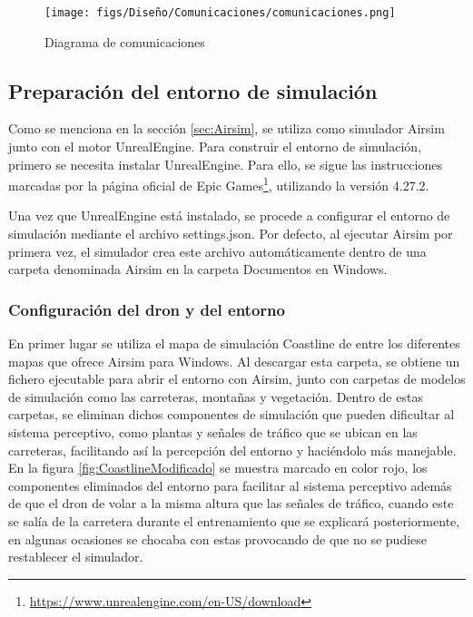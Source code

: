 \begin{figure} [H]
  \begin{center}
    \texttt{[image: figs/Diseño/Comunicaciones/comunicaciones.png]}
  \end{center}
  \caption{Diagrama de comunicaciones}
  \label{fig:diagramadeAirsim}
\end{figure}

\subsection{Preparación del entorno de simulación}
\label{sec:Preparación_entorno}

Como se menciona en la sección \ref{sec:Airsim}, se utiliza como simulador Airsim junto con el motor UnrealEngine. Para construir el entorno de simulación, primero
se necesita instalar UnrealEngine. Para ello, se sigue las instrucciones marcadas por la página oficial de Epic Games\footnote{\url{https://www.unrealengine.com/en-US/download}}, 
utilizando la versión 4.27.2.

Una vez que UnrealEngine está instalado, se procede a configurar el entorno de simulación mediante el archivo settings.json. Por defecto, al ejecutar Airsim 
por primera vez, el simulador crea este archivo automáticamente dentro de una carpeta denominada Airsim en la carpeta Documentos en Windows. 


\subsubsection{Configuración del dron y del entorno}
\label{subsec:Configuración del dron y del entorno}
En primer lugar se utiliza el mapa de simulación Coastline de entre los diferentes mapas que ofrece Airsim para Windows. Al descargar esta carpeta, 
se obtiene un fichero ejecutable para abrir el entorno con Airsim, junto con carpetas de modelos de simulación como las carreteras, montañas y vegetación. Dentro de estas carpetas, se eliminan dichos componentes 
de simulación que pueden dificultar al sistema perceptivo, como plantas y señales de tráfico que se ubican en las carreteras, facilitando así la percepción del entorno 
y haciéndolo más manejable. En la figura \ref{fig:CoastlineModificado} se muestra marcado en color rojo, los componentes eliminados del entorno para facilitar al sistema 
perceptivo además de que el dron de volar a la misma altura que las señales de tráfico, cuando este se salía de la carretera durante el entrenamiento que se explicará 
posteriormente, en algunas ocasiones se chocaba con estas provocando de que no se pudiese restablecer el simulador.

